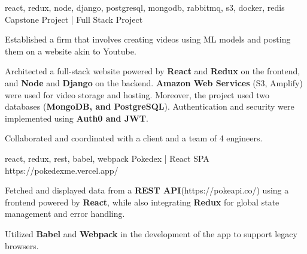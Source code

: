 


\begin{cventries}



  \cventry
    {react, redux, node, django, postgresql, mongodb, rabbitmq, s3, docker, redis } %
    {Capstone Project | Full Stack Project}  %
    {} %
    {} 
    { 
      \begin{cvitems} %
        \item {Established a firm that involves creating videos using ML models and posting them on a website akin to Youtube.} 
        \item {Architected a full-stack website powered by \textbf{React} and \textbf{Redux}  on the frontend, and \textbf{Node} and \textbf{Django} on the backend. \textbf{Amazon Web Services} (S3, Amplify) were used for video storage and hosting. Moreover, the project used two databases (\textbf{MongoDB, and PostgreSQL}). Authentication and security were implemented using \textbf{Auth0 and JWT}.}    
        \item {Collaborated and coordinated with a client and a team of 4 engineers.} 
      \end{cvitems}
    }

  \cventry
    {react, redux, rest, babel, webpack} %
    {Pokedex | React SPA}  %
    {https://pokedexme.vercel.app/} %
    {} 
    {
      \begin{cvitems} %
        \item {Fetched and displayed data from a \textbf{REST API}(https://pokeapi.co/) using a frontend powered by \textbf{React}, while also integrating \textbf{Redux}  for global state management and error handling.}   
        \item {Utilized \textbf{Babel} and \textbf{Webpack}  in the development of the app to support legacy browsers.}   
      \end{cvitems}
    }


\end{cventries}

